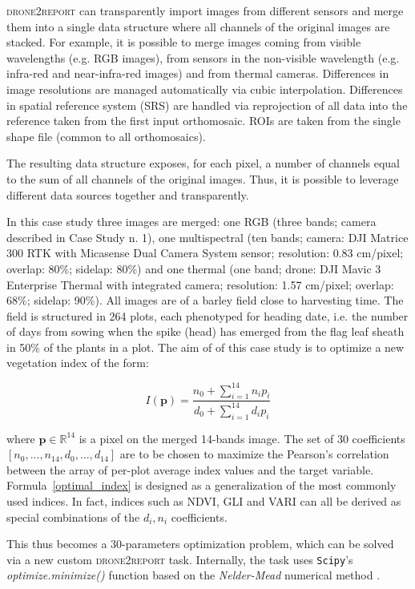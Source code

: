 \documentclass[drones,technicalnote,accept,pdftex,moreauthors]{Definitions/mdpi}
\begin{document}
\textsc{drone2report} can transparently import images from different sensors and merge them into a single data structure where all channels of the original images are stacked. For example, it is possible to merge images coming from visible wavelengths (e.g. RGB images), from sensors in the non-visible wavelength (e.g. infra-red and near-infra-red images) and from thermal cameras. Differences in image resolutions are managed automatically via cubic interpolation. Differences in spatial reference system (SRS) are handled via reprojection of all data into the reference taken from the first input orthomosaic. ROIs are taken from the single shape file (common to all orthomosaics).

The resulting data structure exposes, for each pixel, a number of channels equal to the sum of all channels of the original images. Thus, it is possible to leverage different data sources together and transparently.

In this case study three images are merged: one RGB (three bands; camera described in Case Study n. 1), one multispectral (ten bands; camera: DJI Matrice 300 RTK with Micasense Dual Camera System sensor; resolution: 0.83 cm/pixel; overlap: 80\%; sidelap: 80\%) and one thermal (one band; drone: DJI Mavic 3 Enterprise Thermal with integrated camera; resolution: 1.57 cm/pixel; overlap: 68\%; sidelap: 90\%). All images are of a barley field close to harvesting time. The field is structured in 264 plots, each phenotyped for heading date, i.e. the number of days from sowing when the spike (head) has emerged from the flag leaf sheath in 50\% of the plants in a plot. The aim of of this case study is to optimize a new vegetation index of the form:

\begin{equation}
\label{optimal_index}
I(\textbf{p}) = \frac{n_0 + \sum_{i=1}^{14} n_i p_i}{d_0 + \sum_{i=1}^{14} d_i p_i}
\end{equation}

where $\textbf{p} \in \mathbb{R}^{14}$ is a pixel on the merged 14-bands image. The set of 30 coefficients $[n_0, ..., n_{14}, d_0, ..., d_{14}]$ are to be chosen to maximize the Pearson's correlation between the array of per-plot average index values and the target variable. Formula~\ref{optimal_index} is designed as a generalization of the most commonly used indices. In fact, indices such as NDVI, GLI and VARI \cite{henrich2012entwicklung} can all be derived as special combinations of the $d_i, n_i$ coefficients.

This thus becomes a 30-parameters optimization problem, which can be solved via a new custom \textsc{drone2report} task. Internally, the task uses \texttt{Scipy}'s \cite{2020SciPy-NMeth} \textit{optimize.minimize()} function based on the \textit{Nelder-Mead} numerical method \cite{nelder1965simplex}. 
\end{document}
